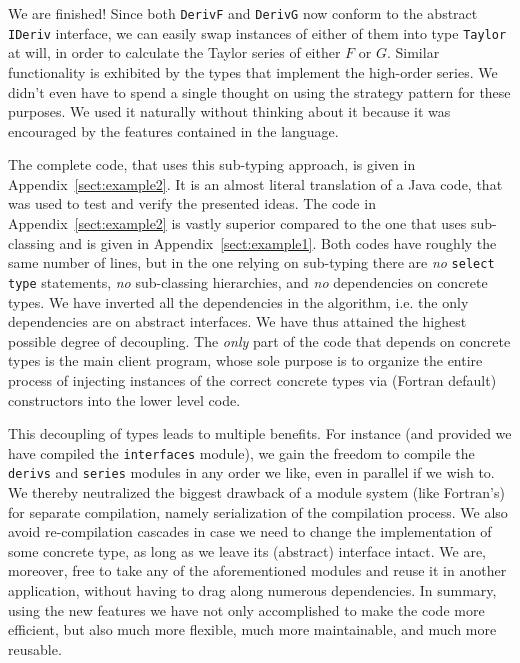 \documentclass[11pt,oneside]{article}
\begin{document}
We are finished! Since both \texttt{DerivF} and \texttt{DerivG} now
conform to the abstract \texttt{IDeriv} interface, we can easily swap
instances of either of them into type \texttt{Taylor} at will, in
order to calculate the Taylor series of either $F$ or $G$. Similar
functionality is exhibited by the types that implement the high-order
series. We didn't even have to spend a single thought on using the
strategy pattern for these purposes. We used it naturally without
thinking about it because it was encouraged by the features contained
in the language.

The complete code, that uses this sub-typing approach, is given in
Appendix~\ref{sect:example2}. It is an almost literal translation of a
Java code, that was used to test and verify the presented ideas. The
code in Appendix~\ref{sect:example2} is vastly superior compared to
the one that uses sub-classing and is given in
Appendix~\ref{sect:example1}. Both codes have roughly the same number
of lines, but in the one relying on sub-typing there are \emph{no}
\texttt{select type} statements, \emph{no} sub-classing hierarchies,
and \emph{no} dependencies on concrete types. We have inverted all the
dependencies in the algorithm, i.e. the only dependencies are on
abstract interfaces. We have thus attained the highest possible degree
of decoupling. The \emph{only} part of the code that depends on
concrete types is the main client program, whose sole purpose is to
organize the entire process of injecting instances of the correct
concrete types via (Fortran default) constructors into the lower level
code.

This decoupling of types leads to multiple benefits. For instance (and
provided we have compiled the \texttt{interfaces} module), we gain the
freedom to compile the \texttt{derivs} and \texttt{series} modules in
any order we like, even in parallel if we wish to. We thereby
neutralized the biggest drawback of a module system (like Fortran's)
for separate compilation, namely serialization of the compilation
process. We also avoid re-compilation cascades in case we need to
change the implementation of some concrete type, as long as we leave
its (abstract) interface intact. We are, moreover, free to take any of
the aforementioned modules and reuse it in another application,
without having to drag along numerous dependencies. In summary, using
the new features we have not only accomplished to make the code more
efficient, but also much more flexible, much more maintainable, and
much more reusable.
\end{document}
